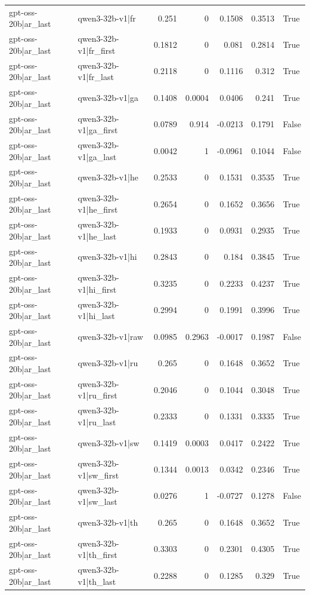 \begin{table}
\begin{tabular}{l l r r r r l}
gpt-oss-20b|ar_last & qwen3-32b-v1|fr & 0.251 & 0 & 0.1508 & 0.3513 & True \\
gpt-oss-20b|ar_last & qwen3-32b-v1|fr_first & 0.1812 & 0 & 0.081 & 0.2814 & True \\
gpt-oss-20b|ar_last & qwen3-32b-v1|fr_last & 0.2118 & 0 & 0.1116 & 0.312 & True \\
gpt-oss-20b|ar_last & qwen3-32b-v1|ga & 0.1408 & 0.0004 & 0.0406 & 0.241 & True \\
gpt-oss-20b|ar_last & qwen3-32b-v1|ga_first & 0.0789 & 0.914 & -0.0213 & 0.1791 & False \\
gpt-oss-20b|ar_last & qwen3-32b-v1|ga_last & 0.0042 & 1 & -0.0961 & 0.1044 & False \\
gpt-oss-20b|ar_last & qwen3-32b-v1|he & 0.2533 & 0 & 0.1531 & 0.3535 & True \\
gpt-oss-20b|ar_last & qwen3-32b-v1|he_first & 0.2654 & 0 & 0.1652 & 0.3656 & True \\
gpt-oss-20b|ar_last & qwen3-32b-v1|he_last & 0.1933 & 0 & 0.0931 & 0.2935 & True \\
gpt-oss-20b|ar_last & qwen3-32b-v1|hi & 0.2843 & 0 & 0.184 & 0.3845 & True \\
gpt-oss-20b|ar_last & qwen3-32b-v1|hi_first & 0.3235 & 0 & 0.2233 & 0.4237 & True \\
gpt-oss-20b|ar_last & qwen3-32b-v1|hi_last & 0.2994 & 0 & 0.1991 & 0.3996 & True \\
gpt-oss-20b|ar_last & qwen3-32b-v1|raw & 0.0985 & 0.2963 & -0.0017 & 0.1987 & False \\
gpt-oss-20b|ar_last & qwen3-32b-v1|ru & 0.265 & 0 & 0.1648 & 0.3652 & True \\
gpt-oss-20b|ar_last & qwen3-32b-v1|ru_first & 0.2046 & 0 & 0.1044 & 0.3048 & True \\
gpt-oss-20b|ar_last & qwen3-32b-v1|ru_last & 0.2333 & 0 & 0.1331 & 0.3335 & True \\
gpt-oss-20b|ar_last & qwen3-32b-v1|sw & 0.1419 & 0.0003 & 0.0417 & 0.2422 & True \\
gpt-oss-20b|ar_last & qwen3-32b-v1|sw_first & 0.1344 & 0.0013 & 0.0342 & 0.2346 & True \\
gpt-oss-20b|ar_last & qwen3-32b-v1|sw_last & 0.0276 & 1 & -0.0727 & 0.1278 & False \\
gpt-oss-20b|ar_last & qwen3-32b-v1|th & 0.265 & 0 & 0.1648 & 0.3652 & True \\
gpt-oss-20b|ar_last & qwen3-32b-v1|th_first & 0.3303 & 0 & 0.2301 & 0.4305 & True \\
gpt-oss-20b|ar_last & qwen3-32b-v1|th_last & 0.2288 & 0 & 0.1285 & 0.329 & True \\

\end{tabular}
\end{table}
